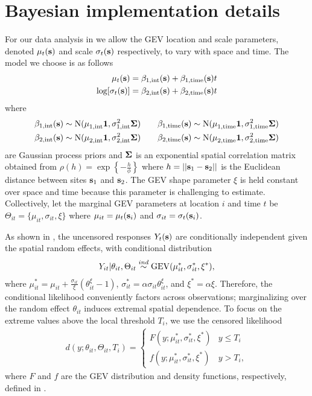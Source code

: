 \documentclass[11pt]{article}
\begin{document}
\section{Bayesian implementation details}\label{ebs:MCMC}
For our data analysis in  we allow the GEV location and scale parameters, denoted $\mu_t(\mbox{\bf s})$ and scale $\sigma_t(\mbox{\bf s})$ respectively, to vary with space and time.
The model we choose is as follows
\begin{align}\label{ebeq:GPprior}
  \mu_t(\mbox{\bf s}) &= \beta_{1, \text{int}}(\mbox{\bf s}) + \beta_{1, \text{time}}(\mbox{\bf s}) t\\
  \log[\sigma_t(\mbox{\bf s})] &= \beta_{2, \text{int}}(\mbox{\bf s}) + \beta_{2, \text{time}}(\mbox{\bf s}) t
\end{align}
where
\begin{align} \label{ebeq:GPhyper}
  \beta_{1, \text{int}}(\mbox{\bf s}) &\sim \text{N}(\mu^{\phantom{2}}_{1, \text{int}} \mbox{\boldmath $1$}, \sigma^2_{1, \text{int}} \mbox{\boldmath $\Sigma$}) \quad &\beta_{1, \text{time}}(\mbox{\bf s}) &\sim \text{N}(\mu^{\phantom{2}}_{1, \text{time}} \mbox{\boldmath $1$}, \sigma^2_{1, \text{time}} \mbox{\boldmath $\Sigma$}) \\
  \beta_{2, \text{int}}(\mbox{\bf s}) &\sim \text{N}(\mu^{\phantom{2}}_{2, \text{int}} \mbox{\boldmath $1$}, \sigma^2_{2, \text{int}} \mbox{\boldmath $\Sigma$}) \quad &\beta_{2, \text{time}}(\mbox{\bf s}) &\sim \text{N}(\mu^{\phantom{2}}_{2, \text{time}} \mbox{\boldmath $1$}, \sigma^2_{2, \text{time}} \mbox{\boldmath $\Sigma$}) \nonumber
\end{align}
are Gaussian process priors and $\mbox{\boldmath $\Sigma$}$ is an exponential spatial correlation matrix obtained from \mbox{$\rho(h) = \exp\left\{- \frac{h}{\phi}\right\}$} where $h = ||\mbox{\bf s}_1 - \mbox{\bf s}_2||$ is the Euclidean distance between sites $\mbox{\bf s}_1$ and $\mbox{\bf s}_2$.
The GEV shape parameter $\xi$ is held constant over space and time because this parameter is challenging to estimate.
Collectively, let the marginal GEV parameters at location $i$ and time $t$ be $\Theta_{it} = \{\mu_{it},\sigma_{it},\xi\}$ where $\mu_{it} = \mu_t(\mbox{\bf s}_i)$ and $\sigma_{it} = \sigma_t(\mbox{\bf s}_i)$.

As shown in \citet{Reich2012}, the uncensored responses $Y_{t}(\mbox{\bf s})$ are conditionally independent given the spatial random effects, with conditional distribution
\begin{align} \label{ebeq:Ycond}
   Y_{it}|\theta_{it},\Theta_{it} \stackrel{ind}{\sim} \mathrm{GEV}(\mu^*_{it}, \sigma_{it}^*,\xi^*),
\end{align}
where $\mu_{it}^* = \mu_{it} + \frac{\sigma_{it}}{\xi}(\theta_{it}^\xi - 1)$,
$\sigma_{it}^* = \alpha\sigma_{it}\theta_{it}^\xi$, and $\xi^* = \alpha\xi$.
Therefore, the conditional likelihood conveniently factors across observations; marginalizing over the random effect $\theta_{it}$ induces extremal spatial dependence.
To focus on the extreme values above the local threshold $T_i$, we use the censored likelihood
\begin{align} \label{ebeq:g}
d(y;\theta_{it},\Theta_{it}, T_i)  =
\left\{\begin{array}{ll}
  F(y;\mu_{it}^*,\sigma_{it}^*,\xi^*) & y \le T_i \\
  f(y;\mu_{it}^*,\sigma_{it}^*,\xi^*) & y>T_i,
\end{array}\right.
\end{align}
where $F$ and $f$ are the GEV distribution and density functions, respectively, defined in .
\end{document}
